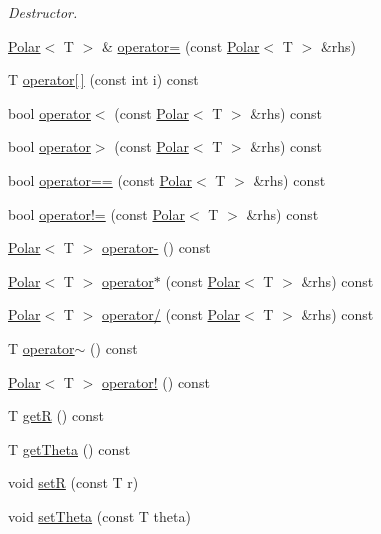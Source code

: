 \begin{DoxyCompactItemize}
\begin{DoxyCompactList}\small\item\em Destructor. \end{DoxyCompactList}\item 
\hyperlink{classPolar}{Polar}$<$ T $>$ \& \hyperlink{classPolar_a653bb22a1d1fdf39464e7952c86ff970}{operator=} (const \hyperlink{classPolar}{Polar}$<$ T $>$ \&rhs)
\item 
T \hyperlink{classPolar_ab9a8189431f2416796c5cda9096dbdf2}{operator\mbox{[}$\,$\mbox{]}} (const int i) const 
\item 
bool \hyperlink{classPolar_a1d838d9fcc6bd22cc8f7853696b27a8b}{operator$<$} (const \hyperlink{classPolar}{Polar}$<$ T $>$ \&rhs) const 
\item 
bool \hyperlink{classPolar_aa55128f4975463c8ec87d92e8cb89ae1}{operator$>$} (const \hyperlink{classPolar}{Polar}$<$ T $>$ \&rhs) const 
\item 
bool \hyperlink{classPolar_a40155f3c10ba1e3356bd1e9dba6f4bf8}{operator==} (const \hyperlink{classPolar}{Polar}$<$ T $>$ \&rhs) const 
\item 
bool \hyperlink{classPolar_a48957dec4f0f6f60d8a69b56584bd037}{operator!=} (const \hyperlink{classPolar}{Polar}$<$ T $>$ \&rhs) const 
\item 
\hyperlink{classPolar}{Polar}$<$ T $>$ \hyperlink{classPolar_a8d02234b8eb93985d1830c7d3d034107}{operator-\/} () const 
\item 
\hyperlink{classPolar}{Polar}$<$ T $>$ \hyperlink{classPolar_a990348f7091d4fac3dcc63fa551106bc}{operator$\ast$} (const \hyperlink{classPolar}{Polar}$<$ T $>$ \&rhs) const 
\item 
\hyperlink{classPolar}{Polar}$<$ T $>$ \hyperlink{classPolar_a239a696ee88a60119fb5a13a265df5a2}{operator/} (const \hyperlink{classPolar}{Polar}$<$ T $>$ \&rhs) const 
\item 
T \hyperlink{classPolar_a417fa96a610c1cc28132fc06eb346b2a}{operator$\sim$} () const 
\item 
\hyperlink{classPolar}{Polar}$<$ T $>$ \hyperlink{classPolar_a6e4ec0c146720b4bd9b2e1da2198b074}{operator!} () const 
\item 
T \hyperlink{classPolar_a08e46e2c552b04f1b2e19dc7978b245a}{getR} () const 
\item 
T \hyperlink{classPolar_ac1aea2b975ccfbfdfbfedf5fb1cc80ae}{get\+Theta} () const 
\item 
void \hyperlink{classPolar_a7a19e9c5820d3ade6938ab8854318094}{setR} (const T r)
\item 
void \hyperlink{classPolar_adcd89628e8d1c0dca46f63e60532dc8d}{set\+Theta} (const T theta)
\end{DoxyCompactItemize}
